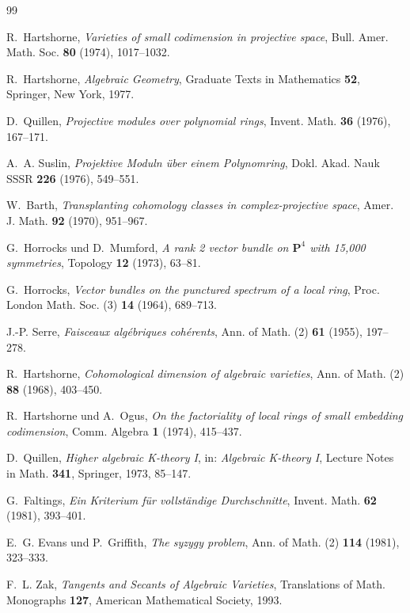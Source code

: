 \documentclass[12pt,a4paper]{amsart}
\theoremstyle{definition}
\theoremstyle{remark}
\begin{document}
\begin{thebibliography}{99}

R.~Hartshorne,
\textit{Varieties of small codimension in projective space},
Bull. Amer. Math. Soc. \textbf{80} (1974), 1017--1032.

R.~Hartshorne,
\textit{Algebraic Geometry},
Graduate Texts in Mathematics \textbf{52},
Springer, New York, 1977.

D.~Quillen,
\textit{Projective modules over polynomial rings},
Invent. Math. \textbf{36} (1976), 167--171.

A.~A. Suslin,
\textit{Projektive Moduln über einem Polynomring},
Dokl. Akad. Nauk SSSR \textbf{226} (1976), 549--551.

W.~Barth,
\textit{Transplanting cohomology classes in complex-projective space},
Amer. J. Math. \textbf{92} (1970), 951--967.

G.~Horrocks und D.~Mumford,
\textit{A rank 2 vector bundle on $\mathbf{P}^4$ with 15{,}000 symmetries},
Topology \textbf{12} (1973), 63--81.

G.~Horrocks,
\textit{Vector bundles on the punctured spectrum of a local ring},
Proc. London Math. Soc. (3) \textbf{14} (1964), 689--713.

J.-P. Serre,
\textit{Faisceaux algébriques cohérents},
Ann. of Math. (2) \textbf{61} (1955), 197--278.

R.~Hartshorne,
\textit{Cohomological dimension of algebraic varieties},
Ann. of Math. (2) \textbf{88} (1968), 403--450.

R.~Hartshorne und A.~Ogus,
\textit{On the factoriality of local rings of small embedding codimension},
Comm. Algebra \textbf{1} (1974), 415--437.

D.~Quillen,
\textit{Higher algebraic K-theory I},
in: \textit{Algebraic K-theory I}, Lecture Notes in Math. \textbf{341},
Springer, 1973, 85--147.

G.~Faltings,
\textit{Ein Kriterium für vollständige Durchschnitte},
Invent. Math. \textbf{62} (1981), 393--401.

E.~G. Evans und P.~Griffith,
\textit{The syzygy problem},
Ann. of Math. (2) \textbf{114} (1981), 323--333.

F.~L. Zak,
\textit{Tangents and Secants of Algebraic Varieties},
Translations of Math. Monographs \textbf{127},
American Mathematical Society, 1993.

\end{thebibliography}
\end{document}

